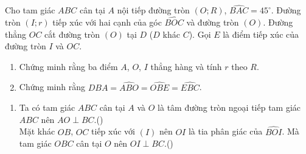\begin{ex}%
 Cho tam giác $ABC$ cân tại $A$ nội tiếp đường tròn $(O;R)$, $\widehat{BAC}=45^\circ$. Đường tròn $(I;r)$ tiếp xúc với hai cạnh của góc $\widehat{BOC}$ và đường tròn $(O)$. Đường thẳng $OC$ cắt đường tròn $(O)$ tại $D$ ($D$ khác $C$). Gọi $E$ là điểm tiếp xúc của đường tròn $I$ và $OC$.
 \begin{enumerate}
  \item Chứng minh rằng ba điểm $A$, $O$, $I$ thẳng hàng và tính $r$ theo $R$.
  \item Chứng minh rằng $\widehat{DBA}=\widehat{ABO}=\widehat{OBE}=\widehat{EBC}$.
 \end{enumerate}
 \loigiai
  {
  \begin{center}
  \end{center}
  \begin{enumerate}
   \item Ta có tam giác $ABC$ cân tại $A$ và $O$ là tâm đường tròn ngoại tiếp tam giác $ABC$ nên $AO \perp BC$.\hfill (\theequation)\label{1820.5}\\
   Mặt khác $OB$, $OC$ tiếp xúc với $(I)$ nên $OI$ là tia phân giác của $\widehat{BOI}$. Mà tam giác $OBC$ cân tại $O$ nên $OI \perp BC$.\hfill (\theequation)\label{1820.6}\\

\end{enumerate}}
\end{ex}
